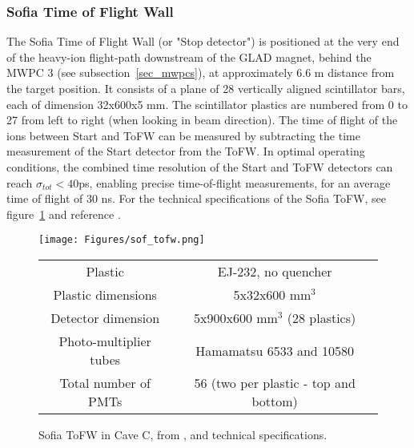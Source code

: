 
\subsubsection{Sofia Time of Flight Wall}
The Sofia Time of Flight Wall (or "Stop detector") is positioned at the very end of the heavy-ion flight-path downstream of the GLAD magnet, behind the MWPC 3 (see subsection~\ref{sec_mwpcs}), at approximately 6.6 m distance from the target position. It consists of a plane of 28 vertically aligned scintillator bars, each of dimension 32x600x5 mm. The scintillator plastics are numbered from 0 to 27 from left to right (when looking in beam direction). The time of flight of the ions between Start and ToFW can be measured by subtracting the time measurement of  the Start detector from the ToFW. In optimal operating conditions, the combined time resolution of the Start and ToFW detectors can reach $\sigma_{tot} < 40$ps, enabling precise time-of-flight measurements, for an average time of flight of 30 ns\cite{martin2021fission}. For the technical specifications of the Sofia ToFW, see figure~\ref{fig:sof_tofw_pic} and reference \cite{bail2011time}.

\begin{figure}[htbp]
    \centering
    \texttt{[image: Figures/sof\_tofw.png]}

    \vspace{1em} %

	\begin{tabular}{cc}\hline 
  	Plastic & EJ-232, no quencher \\ 
  	Plastic dimensions & 5x32x600 mm$^3$ \\
  	Detector dimension & 5x900x600 mm$^3$ (28 plastics) \\ 
  	Photo-multiplier tubes &  Hamamatsu 6533 and 10580 \\
  	Total number of PMTs & 56 (two per plastic - top and bottom) \\ \hline 
  	\end{tabular}

    \caption{Sofia ToFW in Cave C, from \cite{martin2021fission}, and technical specifications.}
    \label{fig:sof_tofw_pic}
\end{figure}


